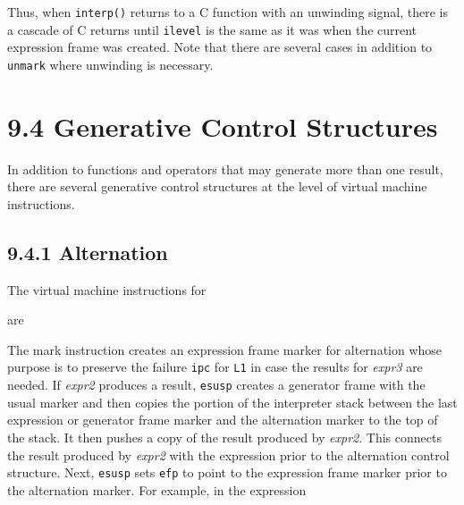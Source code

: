 Thus, when \texttt{interp()} returns to a C function with an unwinding
signal, there is a cascade of C returns until \texttt{ilevel} is the
same as it was when the current expression frame was created. Note
that there are several cases in addition to \texttt{unmark} where
unwinding is necessary.

\section[9.4 Generative Control Structures]{9.4 Generative Control Structures}

In addition to functions and operators that may generate more than one
result, there are several generative control structures at the level
of virtual machine instructions.

\subsection[9.4.1 Alternation]{9.4.1 Alternation}

The virtual machine instructions for


are
\goodbreak
{}

The mark instruction creates an expression frame marker for
alternation whose purpose is to preserve the failure \texttt{ipc} for
\texttt{L1} in case the results for \textit{expr3 }are needed. If
\textit{expr2 }produces a result, \texttt{esusp} creates a generator
frame with the usual marker and then copies the portion of the
interpreter stack between the last expression or generator frame
marker and the alternation marker to the top of the stack. It then
pushes a copy of the result produced by \textit{expr2}. This connects
the result produced by \textit{expr2 }with the expression prior to the
alternation control structure. Next, \texttt{esusp} sets \texttt{efp}
to point to the expression frame marker prior to the alternation
marker. For example, in the expression

